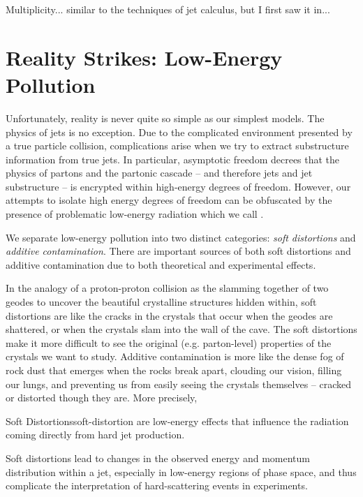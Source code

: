 Multiplicity... similar to the techniques of jet calculus, but I first saw it in...
\fi


\section{Reality Strikes: Low-Energy Pollution}
\label{sec:low-energy-pollution}

Unfortunately, reality is never quite so simple as our simplest models.
%
The physics of jets is no exception.
%
Due to the complicated environment presented by a true particle collision, complications arise when we try to extract substructure information from true jets.
%
In particular, asymptotic freedom decrees that the physics of partons and the partonic cascade -- and therefore jets and jet substructure -- is encrypted within high-energy degrees of freedom.
%
However, our attempts to isolate high energy degrees of freedom can be obfuscated by the presence of problematic low-energy radiation which we call .

We separate low-energy pollution into two distinct categories:
%
\textit{soft distortions} and \textit{additive contamination}.
%
There are important sources of both soft distortions and additive contamination due to both theoretical and experimental effects.

In the analogy of a proton-proton collision as the slamming together of two geodes to uncover the beautiful crystalline structures hidden within, soft distortions are like the cracks in the crystals that occur when the geodes are shattered, or when the crystals slam into the wall of the cave.
%
The soft distortions make it more difficult to see the original (e.g. parton-level) properties of the crystals we want to study.
%
Additive contamination is more like the dense fog of rock dust that emerges when the rocks break apart, clouding our vision, filling our lungs, and preventing us from easily seeing the crystals themselves -- cracked or distorted though they are.
%
More precisely,

\begin{definitionbox}{Soft Distortions}{soft-distortion}
     are low-energy effects that influence the radiation coming directly from hard jet production.

    Soft distortions lead to changes in the observed energy and momentum distribution within a jet, especially in low-energy regions of phase space, and thus complicate the interpretation of hard-scattering events in experiments.
\end{definitionbox}


